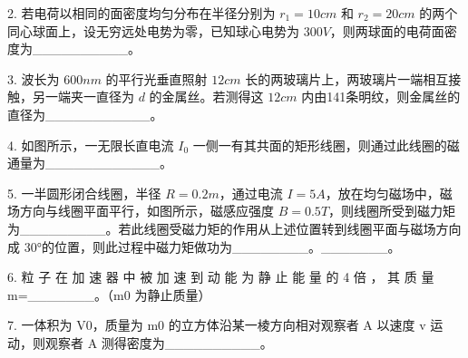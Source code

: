 2. 若电荷以相同的面密度均匀分布在半径分别为 $r_1=10cm$ 和 $r_2=20cm$ 的两个同心球面上，设无穷远处电势为零，已知球心电势为 $300V$，则两球面的电荷面密度为__________。

3. 波长为 $600nm$ 的平行光垂直照射 $12cm$ 长的两玻璃片上，两玻璃片一端相互接触，另一端夹一直径为 $d$ 的金属丝。若测得这 $12cm$ 内由141条明纹，则金属丝的直径为___________。

4. 如图所示，一无限长直电流 $I_0$ 一侧一有其共面的矩形线圈，则通过此线圈的磁通量为____________。

5. 一半圆形闭合线圈，半径 $R=0.2m$，通过电流 $I=5A$，放在均匀磁场中，磁场方向与线圈平面平行，如图所示，磁感应强度 $B=0.5T$，则线圈所受到磁力矩为_________。若此线圈受磁力矩的作用从上述位置转到线圈平面与磁场方向成 30°的位置，则此过程中磁力矩做功为________。_______。

6. 粒 子 在 加 速 器 中 被 加 速 到 动 能 为 静 止 能 量 的 4 倍 ， 其 质 量
m=_______。（m0 为静止质量）

7. 一体积为 V0，质量为 m0 的立方体沿某一棱方向相对观察者 A 以速度
v 运动，则观察者 A 测得密度为__________。